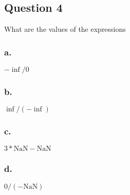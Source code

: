 \documentclass[12pt,a4paper]{article}
\begin{document}
\vfill
\newpage

\subsection*{Question 4}

What are the values of the expressions 
\subsubsection*{a.} $-\inf/0$
\subsubsection*{b.} $\inf/(-\inf)$
\subsubsection*{c.} $3* \mathrm{NaN} - \mathrm{NaN}$
\subsubsection*{d.} $0/(- \mathrm{NaN} )$

\vfill
\newpage
\end{document}
